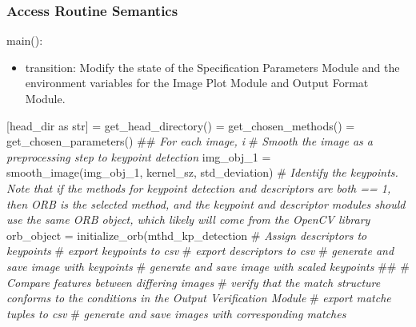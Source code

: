 \documentclass[12pt, titlepage]{article}
\begin{document}
\subsubsection{Access Routine Semantics}
\noindent main():
\begin{itemize}
\item transition: Modify the state of the Specification Parameters Module and the 
environment variables for the Image Plot Module and Output Format Module.
\end{itemize}
[head\_dir as str] = get\_head\_directory() \newline {} 
= get\_chosen\_methods() \newline {} 
= get\_chosen\_parameters() \newline \newline
\#\# \textit{For each image, i}\newline
\# \textit{Smooth the image as a preprocessing step to keypoint detection} \newline
img\_obj\_1 = smooth\_image(img\_obj\_1, kernel\_sz, std\_deviation) \newline \newline
\# \textit{Identify the keypoints. Note that if the methods for keypoint detection and 
descriptors are both == 1, then ORB is the selected method, and the keypoint and descriptor 
modules should use the same ORB object, which likely will come from the OpenCV library}\newline
orb\_object = initialize\_orb(mthd\_kp\_detection\newline 
\# \textit{Assign descriptors to keypoints} \newline \newline
\# \textit{export keypoints to csv} \newline 
\# \textit{export descriptors to csv} \newline\newline
\# \textit{generate and save image with keypoints} \newline 
\# \textit{generate and save image with scaled keypoints} \newline
\#\# \newline \newline
\# \textit{Compare features between differing images} \newline \newline
\# \textit{verify that the match structure conforms to the conditions in the
Output Verification Module} \newline \newline 
\# \textit{export matche tuples to csv} \newline 
\# \textit{generate and save images with corresponding matches} \newline
\end{document}
